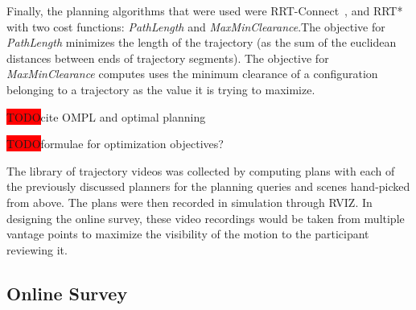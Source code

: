 \documentclass[letterpaper, 10 pt, conference]{ieeeconf}  %
\newcommand{\todo}{\colorbox{red}{TODO}}
\begin{document}
Finally, the planning algorithms that were used were RRT-Connect~\cite{kuffner2000rrt}, and RRT*~\cite{frazzoli-RRTstar} with two cost functions: \emph{PathLength} and \emph{MaxMinClearance}.The objective for \emph{PathLength} minimizes the length of the trajectory (as the sum of the euclidean distances between ends of trajectory segments). The objective for \emph{MaxMinClearance} computes uses the minimum clearance of a configuration belonging to a trajectory as the value it is trying to maximize.

\todo cite OMPL and optimal planning

\todo formulae for optimization objectives?

The library of trajectory videos was collected by computing plans with each of the previously discussed planners for the planning queries and scenes hand-picked from above. The plans were then recorded in simulation through RVIZ. In designing the online survey, these video recordings would be taken from multiple vantage points to maximize the visibility of the motion to the participant reviewing it.

\subsection{Online Survey}
\end{document}
